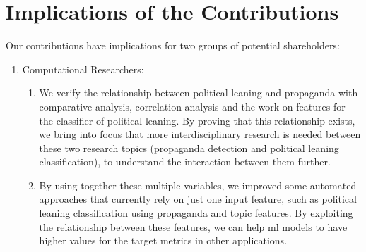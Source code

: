 \section{\statusgreen Implications of the Contributions}
\label{sec:discussion_findings_implications}


Our contributions have implications for two groups of potential shareholders:

\begin{enumerate}
    \item Computational Researchers:
    \begin{enumerate}
        \item We verify the relationship between political leaning and propaganda with comparative analysis, correlation analysis and the work on features for the classifier of political leaning. By proving that this relationship exists, we bring into focus that more interdisciplinary research is needed between these two research topics (propaganda detection and political leaning classification), to understand the interaction between them further.  
        \item By using together these multiple variables, we improved some automated approaches that currently rely on just one input feature, such as political leaning classification using propaganda and topic features. By exploiting the relationship between these features, we can help \acrshort{ml} models to have higher values for the target metrics in other applications.

\end{enumerate}
\end{enumerate}

